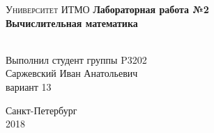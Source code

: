 \begin{titlepage}
\begin{center}

\textsc{Университет ИТМО}
\vfill
\textbf{Лабораторная работа №2\\[4mm]
Вычислительная математика}\\[16mm]
\begin{flushright}
~\\[2mm]Выполнил студент группы P3202
~\\[2mm]Саржевский Иван Анатольевич
~\\[2mm]вариант 13
\end{flushright}
\vfill
Санкт-Петербург\\[2mm]
2018

\end{center}
\end{titlepage}
